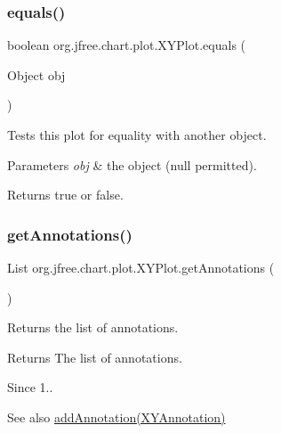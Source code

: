 \subsubsection{\texorpdfstring{equals()}{equals()}}
{\footnotesize\ttfamily boolean org.\+jfree.\+chart.\+plot.\+X\+Y\+Plot.\+equals (\begin{DoxyParamCaption}\item[{Object}]{obj }\end{DoxyParamCaption})}

Tests this plot for equality with another object.


\begin{DoxyParams}{Parameters}
{\em obj} & the object ({\ttfamily null} permitted).\\
\hline
\end{DoxyParams}
\begin{DoxyReturn}{Returns}
{\ttfamily true} or {\ttfamily false}. 
\end{DoxyReturn}
\mbox{\label{classorg_1_1jfree_1_1chart_1_1plot_1_1_x_y_plot_a65d05a1b516c28eed73f42fb7aa9f92f}} 
\subsubsection{\texorpdfstring{get\+Annotations()}{getAnnotations()}}
{\footnotesize\ttfamily List org.\+jfree.\+chart.\+plot.\+X\+Y\+Plot.\+get\+Annotations (\begin{DoxyParamCaption}{ }\end{DoxyParamCaption})}

Returns the list of annotations.

\begin{DoxyReturn}{Returns}
The list of annotations.
\end{DoxyReturn}
\begin{DoxySince}{Since}
1..
\end{DoxySince}
\begin{DoxySeeAlso}{See also}
\mbox{\hyperlink{classorg_1_1jfree_1_1chart_1_1plot_1_1_x_y_plot_ac4428caf611cd9954001c06db33ff779}{add\+Annotation(\+X\+Y\+Annotation)}} 
\end{DoxySeeAlso}
\mbox{\label{classorg_1_1jfree_1_1chart_1_1plot_1_1_x_y_plot_a26062a5440ddb2cda7513504233dce62}} 
